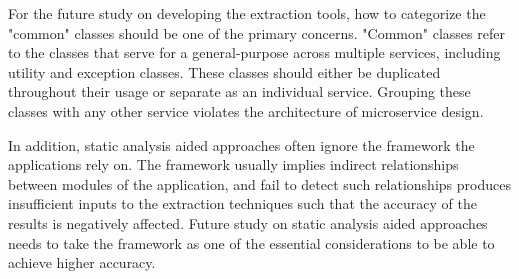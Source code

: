 For the future study on developing the extraction tools, how to categorize the "common" classes should be one of the primary concerns. "Common" classes refer to the classes that serve for a general-purpose across multiple services, including utility and exception classes. These classes should either be duplicated throughout their usage or separate as an individual service. Grouping these classes with any other service violates the architecture of microservice design. 

In addition, static analysis aided approaches often ignore the framework the applications rely on. The framework usually implies indirect relationships between modules of the application, and fail to detect such relationships produces insufficient inputs to the extraction techniques such that the accuracy of the results is negatively affected. Future study on static analysis aided approaches needs to take the framework as one of the essential considerations to be able to achieve higher accuracy.  